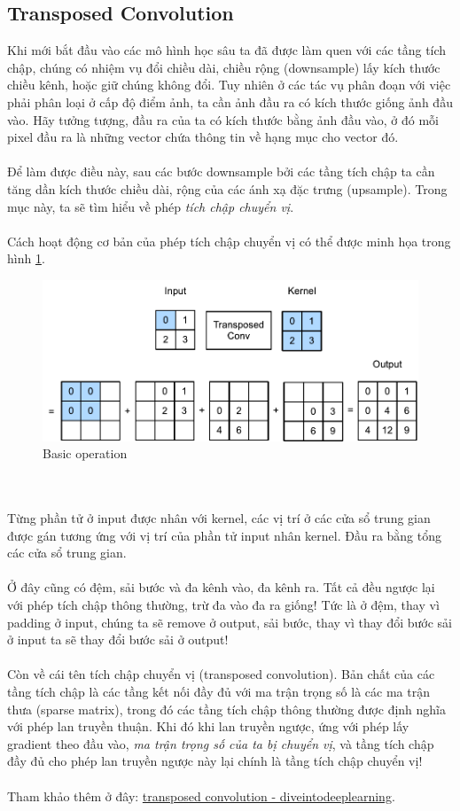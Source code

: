 \documentclass{article}
\begin{document}
\subsection{Transposed Convolution}
Khi mới bắt đầu vào các mô hình học sâu ta đã được làm quen với các tầng tích chập, chúng có nhiệm vụ đổi chiều dài, chiều rộng (downsample) lấy kích thước chiều kênh, hoặc giữ chúng không đổi. Tuy nhiên ở các tác vụ phân đoạn với việc phải phân loại ở cấp độ điểm ảnh, ta cần ảnh đầu ra có kích thước giống ảnh đầu vào. Hãy tưởng tượng, đầu ra của ta có kích thước bằng ảnh đầu vào, ở đó mỗi pixel đầu ra là những vector chứa thông tin về hạng mục cho vector đó.\\\\
Để làm được điều này, sau các bước downsample bởi các tầng tích chập ta cần tăng dần kích thước chiều dài, rộng của các ánh xạ đặc trưng (upsample). Trong mục này, ta sẽ tìm hiểu về phép \textit{tích chập chuyển vị}.\\\\
Cách hoạt động cơ bản của phép tích chập chuyển vị có thể được minh họa trong hình \ref{fig9}.
\begin{figure}[ht!]
    \centering
    \includegraphics[width = 0.7\linewidth]{trans_conv.pdf}
    \caption{Basic operation}
    \label{fig9}
\end{figure}
\\\\
Từng phần tử ở input được nhân với kernel, các vị trí ở các cửa sổ trung gian được gán tương ứng với vị trí của phần tử input nhân kernel. Đầu ra bằng tổng các cửa sổ trung gian.\\\\
Ở đây cũng có đệm, sải bước và đa kênh vào, đa kênh ra. Tất cả đều ngược lại với phép tích chập thông thường, trừ đa vào đa ra giống! Tức là ở đệm, thay vì padding ở input, chúng ta sẽ remove ở output, sải bước, thay vì thay đổi bước sải ở input ta sẽ thay đổi bước sải ở output!\\\\
Còn về cái tên tích chập chuyển vị (transposed convolution). Bản chất của các tầng tích chập là các tầng kết nối đầy đủ với ma trận trọng số là các ma trận thưa (sparse matrix), trong đó các tầng tích chập thông thường được định nghĩa với phép lan truyền thuận. Khi đó khi lan truyền ngược, ứng với phép lấy gradient theo đầu vào, \textit{ma trận trọng số của ta bị chuyển vị}, và tầng tích chập đầy đủ cho phép lan truyền ngược này lại chính là tầng tích chập chuyển vị!\\\\
Tham khảo thêm ở đây: \href{https://d2l.ai/chapter_computer-vision/transposed-conv.html}{transposed convolution - diveintodeeplearning}.\\\\
\end{document}
